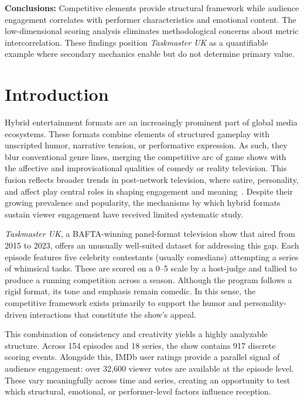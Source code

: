 \documentclass[10pt,letterpaper]{article}
\begin{document}
\textbf{Conclusions:} Competitive elements provide structural framework while audience engagement correlates with performer characteristics and emotional content. The low-dimensional scoring analysis eliminates methodological concerns about metric intercorrelation. These findings position \textit{Taskmaster UK} as a quantifiable example where secondary mechanics enable but do not determine primary value.

\linenumbers

\section*{Introduction}

Hybrid entertainment formats are an increasingly prominent part of global media ecosystems. These formats combine elements of structured gameplay with unscripted humor, narrative tension, or performative expression. As such, they blur conventional genre lines, merging the competitive arc of game shows with the affective and improvisational qualities of comedy or reality television. This fusion reflects broader trends in post-network television, where satire, personality, and affect play central roles in shaping engagement and meaning~\cite{Gray2009}. Despite their growing prevalence and popularity, the mechanisms by which hybrid formats sustain viewer engagement have received limited systematic study.

\textit{Taskmaster UK}, a BAFTA-winning panel-format television show that aired from 2015 to 2023, offers an unusually well-suited dataset for addressing this gap. Each episode features five celebrity contestants (usually comedians) attempting a series of whimsical tasks. These are scored on a 0–5 scale by a host-judge and tallied to produce a running competition across a season. Although the program follows a rigid format, its tone and emphasis remain comedic. In this sense, the competitive framework exists primarily to support the humor and personality-driven interactions that constitute the show’s appeal.

This combination of consistency and creativity yields a highly analyzable structure. Across 154 episodes and 18 series, the show contains 917 discrete scoring events. Alongside this, IMDb user ratings provide a parallel signal of audience engagement: over 32,600 viewer votes are available at the episode level. These vary meaningfully across time and series, creating an opportunity to test which structural, emotional, or performer-level factors influence reception.
\end{document}
